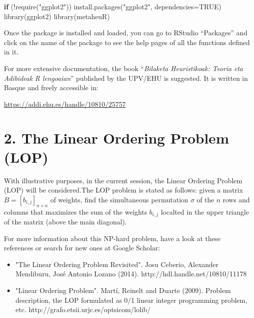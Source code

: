 \documentclass[
]{article}
\newenvironment{Shaded}{\begin{snugshade}}{\end{snugshade}}
\newcommand{\AttributeTok}[1]{\textcolor[rgb]{0.77,0.63,0.00}{#1}}
\newcommand{\ConstantTok}[1]{\textcolor[rgb]{0.00,0.00,0.00}{#1}}
\newcommand{\ControlFlowTok}[1]{\textcolor[rgb]{0.13,0.29,0.53}{\textbf{#1}}}
\newcommand{\FunctionTok}[1]{\textcolor[rgb]{0.00,0.00,0.00}{#1}}
\newcommand{\NormalTok}[1]{#1}
\newcommand{\SpecialCharTok}[1]{\textcolor[rgb]{0.00,0.00,0.00}{#1}}
\newcommand{\StringTok}[1]{\textcolor[rgb]{0.31,0.60,0.02}{#1}}
\begin{document}
\begin{Shaded}
\begin{Highlighting}[]
\ControlFlowTok{if}\NormalTok{ (}\SpecialCharTok{!}\FunctionTok{require}\NormalTok{(}\StringTok{"ggplot2"}\NormalTok{)) }\FunctionTok{install.packages}\NormalTok{(}\StringTok{"ggplot2"}\NormalTok{, }\AttributeTok{dependencies=}\ConstantTok{TRUE}\NormalTok{)}
\FunctionTok{library}\NormalTok{(ggplot2)}
\FunctionTok{library}\NormalTok{(metaheuR)}
\end{Highlighting}
\end{Shaded}

Once the package is installed and loaded, you can go to RStudio
``Packages'' and click on the name of the package to see the help pages
of all the functions defined in it.

For more extensive documentation, the book ``\emph{Bilaketa
Heuristikoak: Teoria eta Adibideak R lengoaian}'' published by the
UPV/EHU is suggested. It is written in Basque and freely accessible in:

\url{https://addi.ehu.es/handle/10810/25757}

\hypertarget{the-linear-ordering-problem-lop}{%
\section{2. The Linear Ordering Problem
(LOP)}\label{the-linear-ordering-problem-lop}}

With illustrative purposes, in the current session, the Linear Ordering
Problem (LOP) will be considered.The LOP problem is stated as follows:
given a matrix \(B=[b_{i,j}]_{n\times n}\) of weights, find the
simultaneous permutation \(\sigma\) of the \(n\) rows and columns that
maximizes the sum of the weights \(b_{i,j}\) localted in the upper
triangle of the matrix (above the main diagonal).

For more information about this NP-hard problem, have a look at these
references or search for new ones at Google Scholar:

\begin{itemize}
\item "The Linear Ordering Problem Revisited". Josu Ceberio, Alexander Mendiburu, José Antonio Lozano (2014). http://hdl.handle.net/10810/11178
\item "Linear Ordering Problem". Martí, Reinelt and Duarte (2009). Problem description, the LOP formulated as 0/1 linear integer programming problem, etc. http://grafo.etsii.urjc.es/optsicom/lolib/
\end{itemize}
\end{document}
